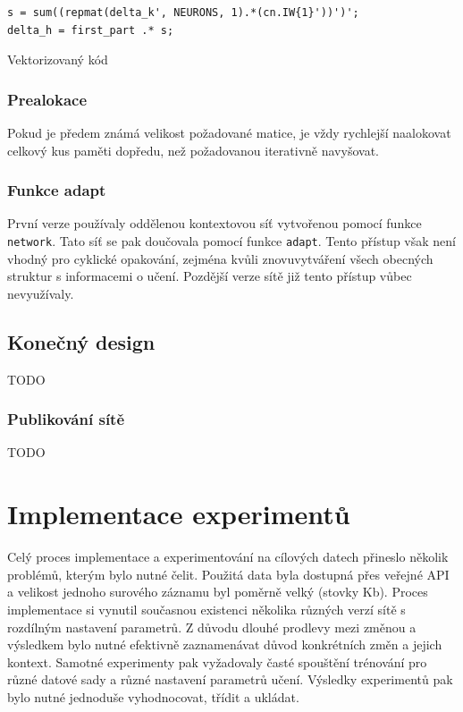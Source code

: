 \documentclass[thesis=M,czech]{FITthesis}[2012/06/26]
\begin{document}
\begin{listing}
\begin{verbatim}
s = sum((repmat(delta_k', NEURONS, 1).*(cn.IW{1}'))')';
delta_h = first_part .* s;
\end{verbatim} 
\caption{Vektorizovaný kód} 
\label{vector-code}
\end{listing}




\subsubsection*{Prealokace}
Pokud je předem známá velikost požadované matice, je vždy rychlejší naalokovat celkový kus paměti dopředu, než požadovanou iterativně navyšovat\cite{preallocate}.




\subsubsection*{Funkce adapt}
První verze používaly oddělenou kontextovou síť vytvořenou pomocí funkce \texttt{network}. Tato síť se pak doučovala pomocí funkce \texttt{adapt}. Tento přístup však není vhodný pro cyklické opakování, zejména kvůli znovuvytváření všech obecných struktur s informacemi o učení. Pozdější verze sítě již tento přístup vůbec nevyužívaly.


\subsection{Konečný design}
TODO

\subsubsection{Publikování sítě}

TODO

\section{Implementace experimentů}

Celý proces implementace a experimentování na cílových datech přineslo několik problémů, kterým bylo nutné čelit. 
Použitá data byla dostupná přes veřejné API a velikost jednoho surového záznamu byl poměrně velký (stovky Kb).
Proces implementace si vynutil současnou existenci několika různých verzí sítě s rozdílným nastavení  parametrů. Z důvodu dlouhé prodlevy mezi změnou a výsledkem bylo nutné efektivně zaznamenávat důvod konkrétních změn a jejich kontext.
Samotné experimenty pak vyžadovaly časté spouštění trénování pro různé datové sady a různé nastavení parametrů učení. Výsledky experimentů pak bylo nutné jednoduše vyhodnocovat, třídit a ukládat. 
\end{document}
